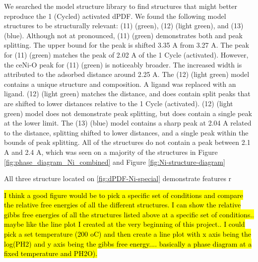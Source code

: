\documentclass[journal=jctcce,manuscript=article]{achemso}
\begin{document}
We searched the model structure library to find structures that might better reproduce the 1 (Cycled) activated dPDF. We found the following model structures to be structurally relevant: (11)  (green), (12)  (light green), and (13)  (blue). Although not at pronounced, (11)  (green) demonstrates both  and  peak splitting. The upper bound for the  peak is shifted 3.35 A from 3.27 A. The  peak for (11)  (green) matches the peak of 2.02 A of the 1 Cycle (activated). However, the ce{Ni-O} peak for (11)  (green) is noticeably broader. The increased width is attributed to the adsorbed  distance around 2.25 A. The (12)  (light green) model contains a unique structure and composition. A  ligand was replaced with an  ligand. (12)  (light green) matches the  distance, and does contain split  peaks that are shifted to lower distances relative to the 1 Cycle (activated). (12)  (light green) model does not demonstrate  peak splitting, but does contain a single peak at the lower  limit. The (13)  (blue) model contains a sharp peak at 2.04 A related to the  distance,  splitting shifted to lower distances, and a single  peak within the bounds of  peak splitting. All of the structures do not contain a  peak between 2.1 A and 2.4 A, which was seen on a majority of the structures in Figure \ref{fig:phase_diagram_Ni_combined} and Figure \ref{fig:Ni-structure-diagram}

All three structure located on \ref{fig:dPDF-Ni-special} demonstrate features r



\hl{I think a good figure would be to pick a specific set of conditions and compare the relative free energies of all the different structures. I can show the relative gibbs free energies of all the structures listed above at a specific set of conditions.. maybe like the line plot I created at the very beginning of this project.. I could pick a set temperature (200 oC) and then create a line plot with x axis being the log(PH2) and y axis being the gibbs free energy.... basically a phase diagram at a fixed temperature and PH2O).}
\end{document}

